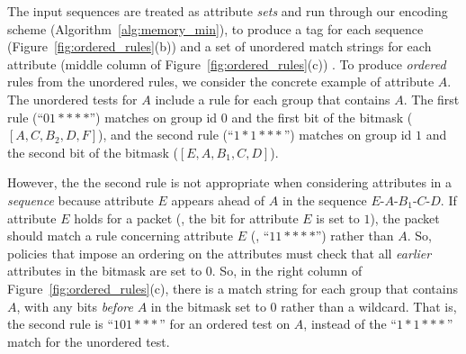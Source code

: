 The input sequences are treated as attribute \emph{sets} and run through our encoding scheme (Algorithm~\ref{alg:memory_min}), to produce a tag for each sequence (Figure~\ref{fig:ordered_rules}(b)) and a set of unordered match strings for each attribute (middle column of Figure~\ref{fig:ordered_rules}(c)) .  To produce \emph{ordered} rules from the unordered rules, we consider the concrete example of attribute $A$.  The unordered tests for $A$ include a rule for each group that contains $A$.  The first rule (``$01****$'') matches on group id $0$ and the first bit of the bitmask ($[A,C,B_2,D,F]$), and the second rule (``$1*1***$'') matches on group id $1$ and the second bit of the bitmask ($[E,A,B_1,C,D]$).

However, the the second rule is not appropriate when considering attributes in a \emph{sequence} because attribute $E$ appears ahead of $A$ in the sequence $E$-$A$-$B_1$-$C$-$D$.  If attribute $E$ holds for a packet (\ie, the bit for attribute $E$ is set to $1$), the packet should match a rule concerning attribute $E$ (\eg, ``$11****$'') rather than $A$.  So, policies that impose an ordering on the attributes must check that all \emph{earlier} attributes in the bitmask are set to $0$.  So, in the right column of Figure~\ref{fig:ordered_rules}(c), there is a match string for each group that contains $A$, with any bits \emph{before} $A$ in the bitmask set to $0$ rather than a wildcard.  That is, the second rule is ``$101***$'' for an ordered test on $A$, instead of the ``$1*1***$'' match for the unordered test.
